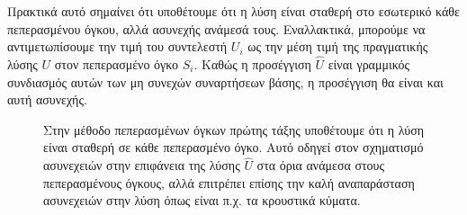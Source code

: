 Πρακτικά αυτό σημαίνει ότι υποθέτουμε ότι η λύση είναι σταθερή στο εσωτερικό κάθε πεπερασμένου όγκου, αλλά ασυνεχής ανάμεσά τους.
Εναλλακτικά, μπορούμε να αντιμετωπίσουμε την τιμή του συντελεστή $U_i$ ως την μέση τιμή της πραγματικής λύσης $U$ στον πεπερασμένο όγκο $S_i$.
Καθώς η προσέγγιση $\hat{U}$ είναι γραμμικός συνδιασμός αυτών των μη συνεχών συναρτήσεων βάσης, η προσέγγιση θα είναι και αυτή ασυνεχής.

\begin{figure}
    \centering
    \caption{Στην μέθοδο πεπερασμένων όγκων πρώτης τάξης υποθέτουμε ότι η λύση είναι σταθερή σε κάθε πεπερασμένο όγκο. Αυτό οδηγεί στον σχηματισμό ασυνεχειών στην επιφάνεια της λύσης $\hat{U}$ στα όρια ανάμεσα στους πεπερασμένους όγκους, αλλά επιτρέπει επίσης την καλή αναπαράσταση ασυνεχειών στην λύση όπως είναι π.χ. τα κρουστικά κύματα.}
    \label{fig:fvm-basis}
\end{figure}

